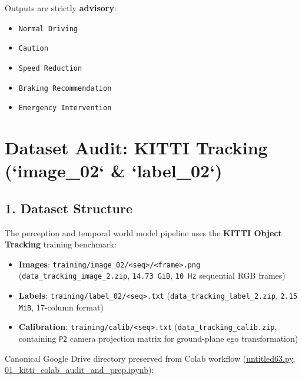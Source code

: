 \documentclass[10.5pt,a4paper]{article}
\begin{document}
Outputs are strictly \textbf{advisory}:

\begin{itemize}[leftmargin=1.5em,itemsep=2pt]
\item \texttt{Normal Driving}
\item \texttt{Caution}
\item \texttt{Speed Reduction}
\item \texttt{Braking Recommendation}
\item \texttt{Emergency Intervention}
\end{itemize}
\newpage
\section{Dataset Audit: KITTI Tracking (`image\_02` \& `label\_02`)}

\subsection{1. Dataset Structure}

The perception and temporal world model pipeline uses the \textbf{KITTI Object Tracking} training benchmark:

\begin{itemize}[leftmargin=1.5em,itemsep=2pt]
\item \textbf{Images}: \texttt{training/\allowbreak{}image\_\allowbreak{}02/\allowbreak{}<seq>/\allowbreak{}<frame>.\allowbreak{}png} (\texttt{data\_\allowbreak{}tracking\_\allowbreak{}image\_\allowbreak{}2.\allowbreak{}zip}, \texttt{14.\allowbreak{}73 GiB}, \texttt{10 Hz} sequential RGB frames)
\item \textbf{Labels}: \texttt{training/\allowbreak{}label\_\allowbreak{}02/\allowbreak{}<seq>.\allowbreak{}txt} (\texttt{data\_\allowbreak{}tracking\_\allowbreak{}label\_\allowbreak{}2.\allowbreak{}zip}, \texttt{2.\allowbreak{}15 MiB}, 17-column format)
\item \textbf{Calibration}: \texttt{training/\allowbreak{}calib/\allowbreak{}<seq>.\allowbreak{}txt} (\texttt{data\_\allowbreak{}tracking\_\allowbreak{}calib.\allowbreak{}zip}, containing \texttt{P2} camera projection matrix for ground-plane ego transformation)
\end{itemize}

Canonical Google Drive directory preserved from Colab workflow (\href{https://github.com/Heisnotanimposter/Totalcare\_autonomous\_driving\_Yolov5/blob/main/untitled63.py}{untitled63.py}, \href{https://github.com/Heisnotanimposter/Totalcare\_autonomous\_driving\_Yolov5/blob/main/colab/01\_kitti\_colab\_audit\_and\_prep.ipynb}{01\_kitti\_colab\_audit\_and\_prep.ipynb}):
\end{document}
